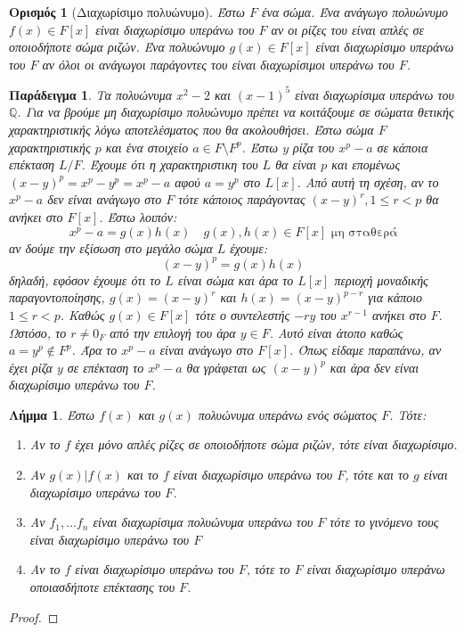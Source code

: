 \documentclass[oneside,a4paper]{article}
\newtheorem{lemma}{Λήμμα}
\newtheorem{example}{Παράδειγμα}
\newtheorem*{defn}{Ορισμός}
\newcommand{\Q}{\mathbb{Q}}
\begin{document}
\begin{defn}[Διαχωρίσιμο πολυώνυμο]
	Έστω $F$ ένα σώμα. Ένα ανάγωγο πολυώνυμο $f(x) \in F[x]$ είναι διαχωρίσιμο υπεράνω του $F$ αν οι ρίζες του είναι απλές σε οποιοδήποτε σώμα ριζών. Ένα πολυώνυμο $g(x) \in F[x]$ είναι διαχωρίσιμο υπεράνω του $F$ αν όλοι οι ανάγωγοι παράγοντες του είναι διαχωρίσιμοι υπεράνω του $F$.
\end{defn}
\begin{example}
	Τα πολυώνυμα $x^2 - 2$ και $(x-1)^5$ είναι διαχωρίσιμα υπεράνω του $\Q$. Για να βρούμε μη διαχωρίσιμο πολυώνυμο πρέπει να κοιτάξουμε σε σώματα θετικής χαρακτηριστικής λόγω αποτελέσματος που θα ακολουθήσει. Έστω σώμα $F$ χαρακτηριστικής $p$ και ένα στοιχείο $a \in F \setminus F^p$. Έστω $y$ ρίζα του $x^p - a$ σε κάποια επέκταση $L/F$. Έχουμε ότι η χαρακτηριστικη του $L$ θα είναι $p$ και επομένως $(x-y)^p = x^p - y^p = x^p - a$ αφού $a = y^p$ στο $L[x]$. Από αυτή τη σχέση, αν το $x^p -a$ δεν είναι ανάγωγο στο $F$ τότε κάποιος παράγοντας $(x-y)^r , 1\leq r < p$ θα ανήκει στο $F[x]$. Έστω λοιπόν:
	$$x^p - a = g(x) h(x) \quad g(x),h(x) \in F[x] \text{ μη σταθερά}$$
	αν δούμε την εξίσωση στο μεγάλο σώμα $L$ έχουμε:
	$$(x-y)^p = g(x)h(x)$$
	δηλαδή, εφόσον έχουμε ότι το $L$ είναι σώμα και άρα το $L[x]$ περιοχή μοναδικής παραγοντοποίησης, $g(x) = (x-y)^r$ και $h(x) = (x-y)^{p-r}$ για κάποιο $1\leq r < p$. Καθώς $g(x) \in F[x]$ τότε ο συντελεστής $-ry$ του $x^{r-1}$ ανήκει στο $F$. Ωστόσο, το $r\neq 0_F$ από την επιλογή του άρα $y \in F$. Αυτό είναι άτοπο καθώς $a = y^p \not\in F^p$. Άρα το $x^p - a$ είναι ανάγωγο στο $F[x]$. Όπως είδαμε παραπάνω, αν έχει ρίζα $y$ σε επέκταση το $x^p -a$ θα γράφεται ως $(x-y)^p$ και άρα δεν είναι διαχωρίσιμο υπεράνω του $F$. 
\end{example}

\begin{lemma}
	\label{tessera tria}
	Έστω $f(x)$ και $g(x)$ πολυώνυμα υπεράνω ενός σώματος $F$. Τότε:
	\begin{enumerate}
		\item Αν το $f$ έχει μόνο απλές ρίζες σε οποιοδήποτε σώμα ριζών, τότε είναι διαχωρίσιμο.
		\item Αν $g(x) | f(x)$ και το $f$ είναι διαχωρίσιμο υπεράνω του $F$, τότε και το $g$ είναι διαχωρίσιμο υπεράνω του $F$.
		\item  Αν $f_1 , \ldots f_n$ είναι διαχωρίσιμα πολυώνυμα υπεράνω του $F$ τότε το γινόμενο τους είναι διαχωρίσιμο υπεράνω του $F$
		\item  Αν το $f$ είναι διαχωρίσιμο υπεράνω του $F$, τότε το $F$ είναι διαχωρίσιμο υπεράνω οποιασδήποτε επέκτασης του $F$.
	\end{enumerate}

\end{lemma}
\begin{proof}
\end{proof}
\end{document}
